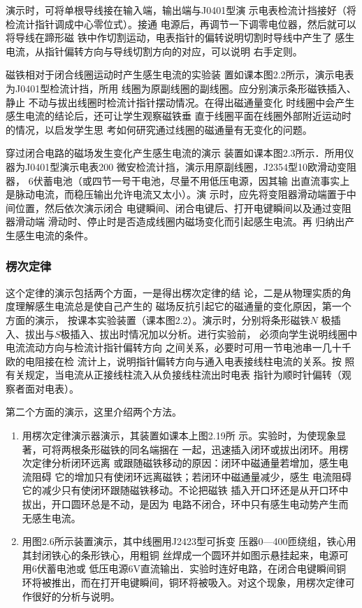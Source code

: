 演示时，可将单根导线接在输入端，输出端与J0401型演
示电表检流计挡接好（将检流计指针调成中心零位式）。接通
电源后，再调节一下调零电位器，然后就可以将导线在蹄形磁
铁中作切割运动，电表指针的偏转说明切割时导线中产生了
感生电流，从指针偏转方向与导线切割方向的对应，可以说明
右手定则。

磁铁相对于闭合线圈运动时产生感生电流的实验装
置如课本图2.2所示，演示电表为J0401型检流计挡，所用
线圈为原副线圈的副线圈。应分别演示条形磁铁插入、静止
不动与拔出线圈时检流计指针摆动情况。在得出磁通量变化
时线圈中会产生感生电流的结论后，还可让学生观察磁铁垂
直于线圈平面在线圈外部附近运动时的情况，以启发学生思
考如何研究通过线圈的磁通量有无变化的问题。

穿过闭合电路的磁场发生变化产生感生电流的演示
装置如课本图2.3所示．所用仪器为J0401型演示电表200
微安检流计挡，演示用原副线圈，J2354型10欧滑动变阻器，
6伏蓄电池（或四节一号干电池，尽量不用低压电源，因其输
出直流事实上是脉动电流，而稳压输出允许电流又太小）。演
示时，应先将变阻器滑动端置于中间位置，然后依次演示闭合
电键瞬间、闭合电键后、打开电键瞬间以及通过变阻器滑动端
滑动时、停止时是否造成线圈内磁场变化而引起感生电流。再
归纳出产生感生电流的条件。

\subsubsection{楞次定律}
这个定律的演示包括两个方面，一是得出楞次定律的结
论，二是从物理实质的角度理解感生电流总是使自己产生的
磁场反抗引起它的磁通量的变化原因，第一个方面的演示，
按课本实验装置（课本图2.2）。演示时，分别将条形磁铁$N$
极插入、拔出与$S$极插入、拔出时情况加以分析。进行实验前，
必须向学生说明线圈中电流流动方向与检流计指针偏转方向
之间关系，必要时可用一节电池串一几十千欧的电阻接在检
流计上，说明指针偏转方向与通入电表接线柱电流的关系。按
照有关规定，当电流从正接线柱流入从负接线柱流出时电表
指针为顺时针偏转（观察者面对电表）。

第二个方面的演示，这里介绍两个方法。
\begin{enumerate}
\item 用楞次定律演示器演示，其装置如课本上图2.19所
示。实验时，为使现象显著，可将两根条形磁铁的同名端捆在
一起，迅速插入闭环或拔出闭环。用楞次定律分析闭环远离
或跟随磁铁移动的原因：闭环中磁通量若增加，感生电流阻碍
它的增加只有使闭环远离磁铁；若闭环中磁通量减少，感生
电流阻碍它的减少只有使闭环跟随磁铁移动。不论把磁铁
插入开口环还是从开口环中拔出，开口圆环总是不动，是因为
电路不闭合，环中只有感生电动势产生而无感生电流。
\item 用图2.6所示装置演示，其中线圈用J2423型可拆变
压器0—400匝绕组，铁心用其封闭铁心的条形铁心，用粗铜
丝焊成一个圆环并如图示悬挂起来，电源可用6伏蓄电池或
低压电源6V直流输出．实验时连好电路，在闭合电键瞬间铜
环将被推出，而在打开电键瞬间，铜环将被吸入。对这个现象，用楞次定律可作很好的分析与说明。
\end{enumerate}

